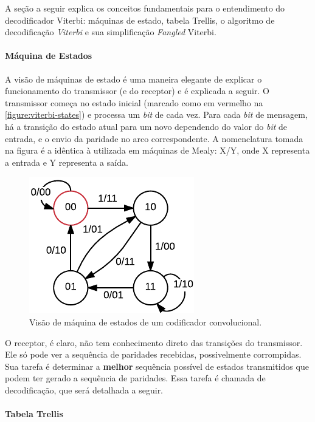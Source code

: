 	A seção a seguir explica os conceitos fundamentais para o entendimento do decodificador Viterbi: máquinas de estado, tabela Trellis, o algoritmo de decodificação \textit{Viterbi} e sua simplificação \textit{Fangled} Viterbi.

	\paragraph{Máquina de Estados}

	A visão de máquinas de estado é uma maneira elegante de explicar o funcionamento do transmissor (e do receptor) e é explicada a seguir. O transmissor começa no estado inicial (marcado como em vermelho na \autoref{figure:viterbi-states}) e processa um \textit{bit} de cada vez. Para cada \textit{bit} de mensagem, há a transição do estado atual para um novo dependendo do valor do \textit{bit} de entrada, e o envio da paridade no arco correspondente. A nomenclatura tomada na figura é a idêntica à utilizada em máquinas de Mealy: X/Y, onde X representa a entrada e Y representa a saída.
	\begin{figure}[htb]
		\caption{\label{figure:viterbi-states}Visão de máquina de estados de um codificador convolucional.}
		\centering
		\includegraphics[width=0.25\textheight]{viterbi/states.pdf}
	\end{figure}
	O receptor, é claro, não tem conhecimento direto das transições do transmissor. Ele só pode ver a sequência de paridades recebidas, possivelmente corrompidas. Sua tarefa é determinar a \textbf{melhor} sequência possível de estados transmitidos que podem ter gerado a sequência de paridades. Essa tarefa é chamada de decodificação, que será detalhada a seguir.

	\paragraph{Tabela Trellis}

